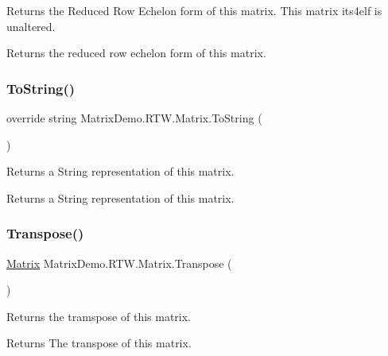 Returns the Reduced Row Echelon form of this matrix. This matrix its4elf is unaltered. 

\begin{DoxyReturn}{Returns}
the reduced row echelon form of this matrix.
\end{DoxyReturn}
\mbox{\label{class_matrix_demo_1_1_r_t_w_1_1_matrix_a6dcaf1d6a6050cea143f68da4a802900}} 
\subsubsection{\texorpdfstring{To\+String()}{ToString()}}
{\footnotesize\ttfamily override string Matrix\+Demo.\+R\+T\+W.\+Matrix.\+To\+String (\begin{DoxyParamCaption}{ }\end{DoxyParamCaption})}



Returns a String representation of this matrix. 

\begin{DoxyReturn}{Returns}
a String representation of this matrix.
\end{DoxyReturn}
\mbox{\label{class_matrix_demo_1_1_r_t_w_1_1_matrix_a2718067191d516f881e29baf49db7604}} 
\subsubsection{\texorpdfstring{Transpose()}{Transpose()}}
{\footnotesize\ttfamily \mbox{\hyperlink{class_matrix_demo_1_1_r_t_w_1_1_matrix}{Matrix}} Matrix\+Demo.\+R\+T\+W.\+Matrix.\+Transpose (\begin{DoxyParamCaption}{ }\end{DoxyParamCaption})}



Returns the tramspose of this matrix. 

\begin{DoxyReturn}{Returns}
The transpose of this matrix.
\end{DoxyReturn}


